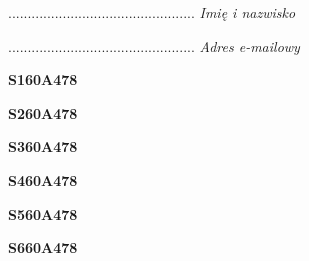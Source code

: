 \begin{turn}{90}\begin{minipage}{\linewidth} \vspace{20mm} ................................................  \textit{Imię i nazwisko}\end{minipage}\end{turn}

\begin{turn}{90}\begin{minipage}{\linewidth} \vspace{20mm} ................................................  \textit{Adres e-mailowy}\end{minipage}\end{turn}

\begin{turn}{90}\huge \begin{minipage}{\linewidth} \vspace{10mm}\textbf{S160A478}\end{minipage}\end{turn}

\begin{turn}{90}\huge \begin{minipage}{\linewidth} \vspace{10mm}\textbf{S260A478}\end{minipage}\end{turn}

\begin{turn}{90}\huge \begin{minipage}{\linewidth} \vspace{10mm}\textbf{S360A478}\end{minipage}\end{turn}

\begin{turn}{90}\huge \begin{minipage}{\linewidth} \vspace{10mm}\textbf{S460A478}\end{minipage}\end{turn}

\begin{turn}{90}\huge \begin{minipage}{\linewidth} \vspace{10mm}\textbf{S560A478}\end{minipage}\end{turn}

\begin{turn}{90}\huge \begin{minipage}{\linewidth} \vspace{10mm}\textbf{S660A478}\end{minipage}\end{turn}

